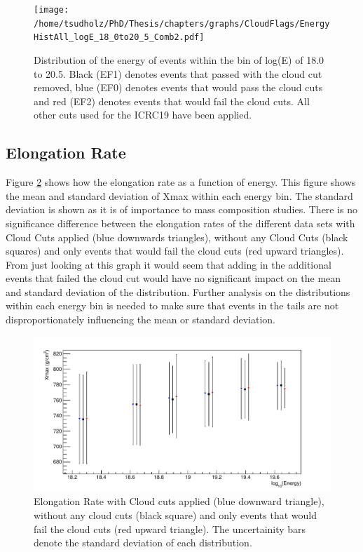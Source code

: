 \begin{figure}[h]
\centering
\texttt{[image: /home/tsudholz/PhD/Thesis/chapters/graphs/CloudFlags/EnergyHistAll\_logE\_18\_0to20\_5\_Comb2.pdf]}
\caption{Distribution of the energy of events within the bin of log(E) of 18.0 to 20.5. Black (EF1) denotes events that passed with the cloud cut removed, blue (EF0) denotes events that would pass the cloud cuts and red (EF2) denotes events that would fail the cloud cuts. All other cuts used for the ICRC19 have been applied.} \label{fig:cloudFlag_energyDist}
\end{figure}

\subsection{Elongation Rate}

Figure \ref{fig:ElongRate_hist} shows how the elongation rate as a function of energy. This figure shows the mean and standard deviation of Xmax within each energy bin. The standard deviation is shown as it is of importance to mass composition studies. There is no significance difference between the elongation  rates of the different data sets with Cloud Cuts applied (blue downwards triangles), without any Cloud Cuts (black squares) and only events that would fail the cloud cuts (red upward triangles). From just looking at this graph it would seem that adding in the additional events that failed the cloud cut would have no significant impact on the mean and standard deviation of the distribution. Further analysis on the distributions within each energy bin is needed to make sure that events in the tails are not disproportionately influencing the mean or standard deviation.

\begin{figure}[h]
\centering
\includegraphics[width=\textwidth]{chapters/graphs/CloudFlags/ElongationRate.pdf}
\caption{Elongation Rate with Cloud cuts applied (blue downward triangle), without any cloud cuts (black square) and only events that would fail the cloud cuts (red upward triangle). The uncertainity bars denote the standard deviation of each distribution.} \label{fig:ElongRate_hist}
\end{figure}



